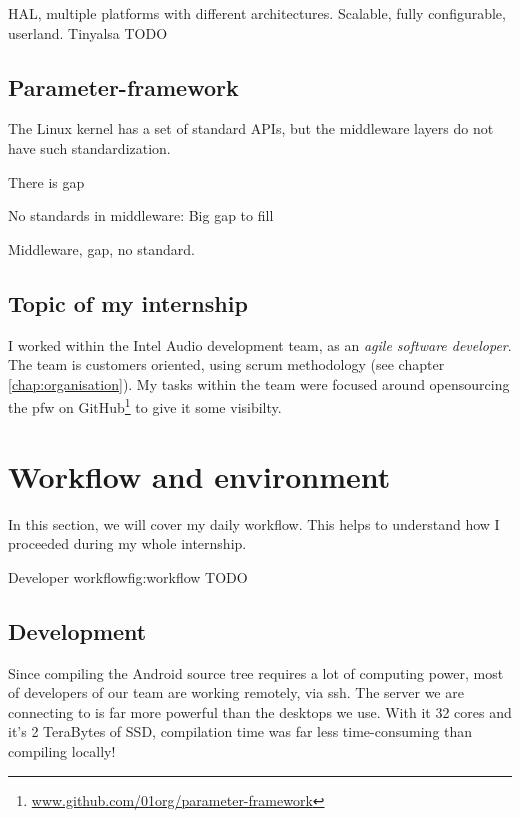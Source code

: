 HAL, multiple platforms with different architectures.
Scalable, fully configurable, userland.
Tinyalsa
TODO

\subsection{Parameter-framework}
\label{sec:parameter-framework}
The Linux \gls{kernel} has a set of standard APIs, but the middleware layers do not have such standardization.

There is gap

No standards in middleware:
Big gap to fill


Middleware, gap, no standard.

\subsection{Topic of my internship}

I worked within the Intel Audio development team, as an \emph{agile
software developer}. The team is customers oriented, using \gls{scrum}
methodology (see chapter \ref{chap:organisation}). My tasks
within the team were focused around opensourcing the \gls{pfw} on
GitHub\footnote{\url{www.github.com/01org/parameter-framework}} to give it some
visibilty.


\section{Workflow and environment}
In this section, we will cover my daily workflow. This helps
to understand how I proceeded during my whole internship.

\begin{figureGraphics}{Developer workflow}{fig:workflow}
    TODO
\end{figureGraphics}


\subsection{Development}
Since compiling the Android source tree requires a lot of computing power,
most of developers of our team are working remotely, via ssh.
The server we are connecting to is far more powerful than the desktops we use.
With it 32 cores and it's 2 TeraBytes of SSD, compilation time was far less time-consuming
than compiling locally!

